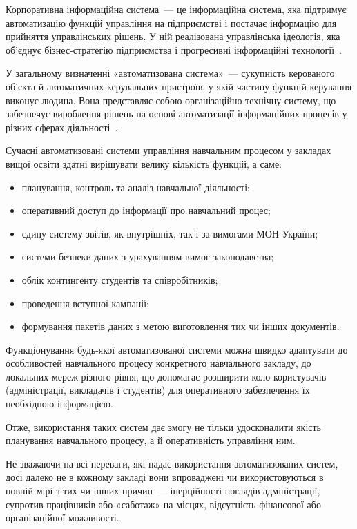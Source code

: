\label{subsubs:KIS}

Корпоративна інформаційна система~--- це інформаційна система, яка підтримує автоматизацію функцій управління на підприємстві і постачає інформацію для прийняття управлінських рішень. У ній реалізована управлінська ідеологія, яка об'єднує бізнес-стратегію підприємства і прогресивні інформаційні технології~\cite{гужва2001інформаційні}.

У загальному визначенні «автоматизована система»~--- сукупність керованого об’єкта й автоматичних керувальних пристроїв, у якій частину функцій керування виконує людина. Вона представляє собою організаційно-технічну систему, що забезпечує вироблення рішень на основі автоматизації інформаційних процесів у різних сферах діяльності~\cite{гужва2001інформаційні}. 

Сучасні автоматизовані системи управління навчальним процесом у  закладах вищої освіти здатні вирішувати велику кількість функцій, а саме:
\begin{itemize}
	\item планування, контроль та аналіз навчальної діяльності;
	\item оперативний доступ до інформації про навчальний процес;
	\item єдину систему звітів, як внутрішніх, так і за вимогами МОН України;
	\item системи безпеки даних з урахуванням вимог законодавства;
	\item облік контингенту студентів та співробітників;
	\item проведення вступної кампанії;
	\item формування пакетів даних з метою виготовлення тих чи інших документів.
\end{itemize}

Функціонування будь-якої автоматизованої системи можна швидко адаптувати до особливостей навчального процесу конкретного навчального закладу, до локальних мереж різного рівня, що допомагає розширити коло користувачів (адміністрації, викладачів і студентів) для оперативного забезпечення їх необхідною інформацією. 

Отже, використання таких систем дає змогу не тільки удосконалити якість планування навчального процесу, а й оперативність управління ним.

Не зважаючи на всі переваги, які надає використання автоматизованих систем, досі далеко не в кожному закладі вони впроваджені чи використовуються в повній мірі з тих чи інших причин~--- інерційності поглядів адміністрації, супротив працівників або «саботаж» на місцях, відсутність фінансової або організаційної можливості.

